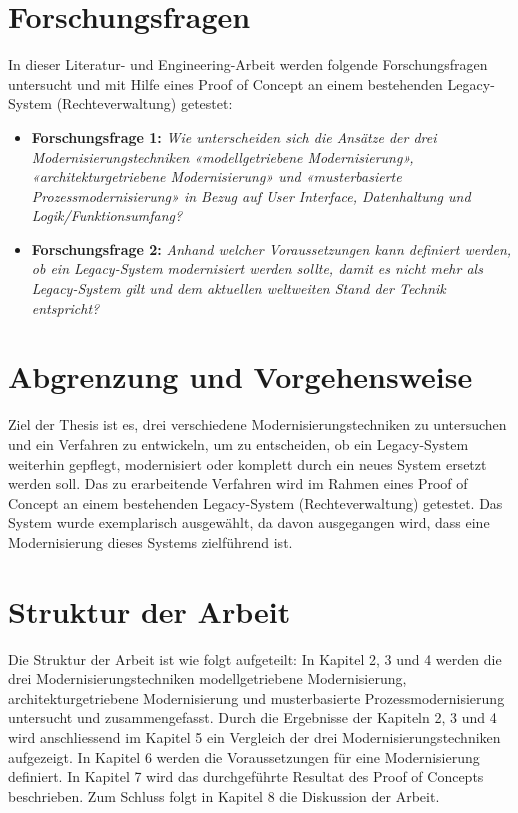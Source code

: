 \section{Forschungsfragen}
\label{sec:ff}
In dieser Literatur- und Engineering-Arbeit werden folgende Forschungsfragen untersucht und mit Hilfe eines Proof of Concept an einem bestehenden Legacy-System (Rechteverwaltung) getestet:
\begin{itemize}
	\item \textbf{Forschungsfrage 1:}
\emph{Wie unterscheiden sich die Ansätze der drei Modernisierungstechniken «modellgetriebene Modernisierung», «architekturgetriebene Modernisierung» und «musterbasierte Prozessmodernisierung» in Bezug auf User Interface, Datenhaltung und Logik/Funktionsumfang? }
	\item \textbf{Forschungsfrage 2:}
\emph{Anhand welcher Voraussetzungen kann definiert werden, ob ein Legacy-System modernisiert werden sollte, damit es nicht mehr als Legacy-System gilt und dem aktuellen weltweiten Stand der Technik entspricht?}
\end{itemize}

\section{Abgrenzung und Vorgehensweise}
Ziel der Thesis ist es, drei verschiedene Modernisierungstechniken zu untersuchen und ein Verfahren zu entwickeln, um zu entscheiden, ob ein Legacy-System weiterhin gepflegt, modernisiert oder komplett durch ein neues System ersetzt werden soll. Das zu erarbeitende Verfahren wird im Rahmen eines Proof of Concept an einem bestehenden Legacy-System (Rechteverwaltung) getestet. Das System wurde exemplarisch ausgewählt, da davon ausgegangen wird, dass eine Modernisierung dieses Systems zielführend ist.

\section{Struktur der Arbeit}
Die Struktur der Arbeit ist wie folgt aufgeteilt: In Kapitel 2, 3 und 4 werden die drei Modernisierungstechniken modellgetriebene Modernisierung, architekturgetriebene Modernisierung und musterbasierte Prozessmodernisierung untersucht und zusammengefasst. Durch die Ergebnisse der Kapiteln 2, 3 und 4 wird anschliessend im Kapitel 5 ein Vergleich der drei Modernisierungstechniken aufgezeigt. In Kapitel 6 werden die Voraussetzungen für eine Modernisierung definiert. In Kapitel 7 wird das durchgeführte Resultat des Proof of Concepts beschrieben. Zum Schluss folgt in Kapitel 8 die Diskussion der Arbeit.